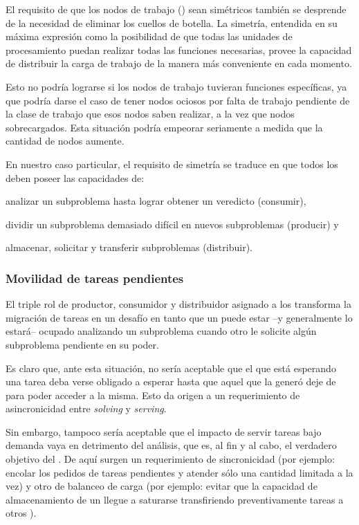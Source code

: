 El requisito de que los nodos de trabajo (\ws) sean simétricos también se desprende
de la necesidad de eliminar los cuellos de botella. La simetría, entendida en su
máxima expresión como la posibilidad de que todas las unidades de
procesamiento puedan realizar todas las funciones necesarias, provee la
capacidad de distribuir la carga de trabajo de la manera más conveniente en
cada momento.

Esto no podría lograrse si los nodos de trabajo tuvieran
funciones específicas, ya que podría darse el caso de tener nodos ociosos
por falta de trabajo pendiente de la clase de trabajo que esos nodos saben
realizar, a la vez que nodos sobrecargados. Esta situación podría empeorar
seriamente a medida que la cantidad de nodos aumente.

En nuestro caso particular, el requisito de simetría se traduce en que
todos los \ws deben poseer las capacidades de: \begin{inparaenum}[a)] \item analizar un
subproblema hasta lograr obtener un veredicto (consumir), \item
dividir un subproblema demasiado difícil en nuevos subproblemas (producir) y \item almacenar,
solicitar y transferir subproblemas (distribuir). \end{inparaenum}


\subsubsection{Movilidad de tareas pendientes}

El triple rol de productor, consumidor y distribuidor asignado a los \ws
transforma la migración de tareas en un desafío en tanto que un \w puede
estar --y generalmente lo estará-- ocupado analizando un
subproblema cuando otro \w le solicite algún subproblema
pendiente en su poder.

Es claro que, ante esta situación, no sería aceptable que el \w que está
esperando una tarea deba verse obligado a esperar hasta que aquel que la generó
deje de \solvear para poder acceder a la misma. Esto da origen a un requerimiento
de asincronicidad entre \emph{solving} y \emph{serving}.

Sin embargo, tampoco sería aceptable que el impacto de servir tareas bajo demanda vaya en
detrimento del análisis, que es, al fin y al cabo, el verdadero objetivo del \w.
De aquí surgen un requerimiento de sincronicidad (por ejemplo: encolar los pedidos de
tareas pendientes y atender sólo una cantidad limitada a la vez) y otro de balanceo
de carga (por ejemplo: evitar que la capacidad de almacenamiento de un \w llegue a
saturarse transfiriendo preventivamente tareas a otros \ws).

